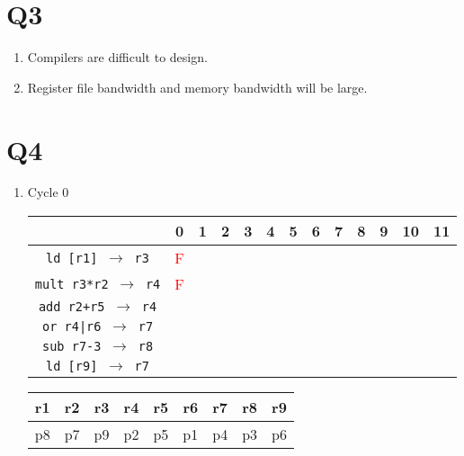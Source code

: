 \documentclass[12pt]{article}
\begin{document}
\section*{Q3}

	\begin{enumerate}
		\item
			Compilers are difficult to design.
		\item
			Register file bandwidth and memory bandwidth will be large.
	\end{enumerate}

\section*{Q4}

	\begin{enumerate}
		\item
			Cycle 0
			\begin{table}[H]
				\begin{tabular}{|c|c|c|c|c|c|c|c|c|c|c|c|c|}
					\hline
					 & 0 & 1 & 2 & 3 & 4 & 5 & 6 & 7 & 8 & 9 & 10 & 11\\
					\hline
					\texttt{ld [r1] $\rightarrow$ r3} & \textcolor{red}{F} &  &  &  &  &  &  &  &  &  &  &\\
					\hline
					\texttt{mult r3*r2 $\rightarrow$ r4} & \textcolor{red}{F} &  &  &  &  &  &  &  &  &  &  &\\
					\hline
					\texttt{add r2+r5 $\rightarrow$ r4} &  &  &  &  &  &  &  &  &  &  &  &\\
					\hline
					\texttt{or r4|r6 $\rightarrow$ r7} &  &  &  &  &  &  &  &  &  &  &  &\\
					\hline
					\texttt{sub r7-3 $\rightarrow$ r8} &  &  &  &  &  &  &  &  &  &  &  &\\
					\hline
					\texttt{ld [r9] $\rightarrow$ r7} &  &  &  &  &  &  &  &  &  &  &  &\\
					\hline 
				\end{tabular}
			\end{table}
			\begin{table}[H]
				\begin{tabular}{|c|c|c|c|c|c|c|c|c|}
					\hline
					r1 & r2 & r3 & r4 & r5 & r6 & r7 & r8 & r9\\
					\hline
					p8 & p7 & p9 & p2 & p5 & p1 & p4 & p3 & p6\\
					\hline
				\end{tabular}
			\end{table}
			\begin{table}[H]

\end{table}
\end{enumerate}
\end{document}
